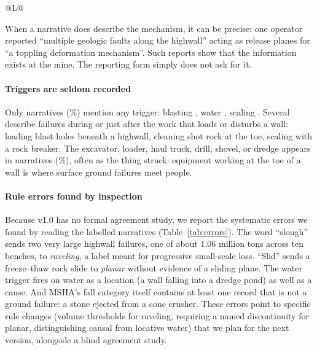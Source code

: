 \documentclass[letterpaper,twocolumn,10pt]{article}
\begin{document}
\begin{table}[t]
\small
\begin{tabularx}{\columnwidth}{@{}L@{}}
\toprule
{}
\bottomrule
\end{tabularx}
\caption{Verbatim MSHA narratives by rule label (commodity, state, year; degree of injury). Narratives are public records, quoted as filed.}
\label{tab:modesq}
\end{table}

When a narrative does describe the mechanism, it can be precise: one operator reported ``multiple geologic faults along the highwall'' acting as release planes for ``a toppling deformation mechanism''. Such reports show that the information exists at the mine. The reporting form simply does not ask for it.

\paragraph{Triggers are seldom recorded} Only \TrigAny{} narratives (\PctTrigAny\%) mention any trigger: blasting \TrigBlasting, water \TrigWater, scaling \TrigScaling. Several describe failures during or just after the work that loads or disturbs a wall: loading blast holes beneath a highwall, cleaning shot rock at the toe, scaling with a rock breaker. The excavator, loader, haul truck, drill, shovel, or dredge appears in \NEquipment{} narratives (\PctEquipment\%), often as the thing struck: equipment working at the toe of a wall is where surface ground failures meet people.

\paragraph{Rule errors found by inspection} Because v1.0 has no formal agreement study, we report the systematic errors we found by reading the labelled narratives (Table~\ref{tab:errors}). The word ``slough'' sends two very large highwall failures, one of about 1.06 million tons across ten benches, to \emph{raveling}, a label meant for progressive small-scale loss. ``Slid'' sends a freeze--thaw rock slide to \emph{planar} without evidence of a sliding plane. The water trigger fires on water as a location (a wall falling into a dredge pond) as well as a cause. And MSHA's fall category itself contains at least one record that is not a ground failure: a stone ejected from a cone crusher. These errors point to specific rule changes (volume thresholds for raveling, requiring a named discontinuity for planar, distinguishing causal from locative water) that we plan for the next version, alongside a blind agreement study.
\end{document}
